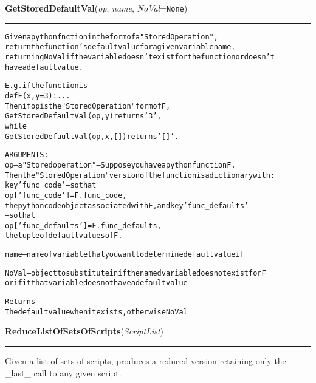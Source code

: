     \vspace{0.5ex}

\hspace{.8\funcindent}\begin{boxedminipage}{\funcwidth}

    \raggedright \textbf{GetStoredDefaultVal}(\textit{op}, \textit{name}, \textit{NoVal}={\tt None})

    \vspace{-1.5ex}

    \rule{\textwidth}{0.5\fboxrule}
\setlength{\parskip}{2ex}
\begin{alltt}

Given a python fnction in the form of a "Stored Operation", 
return the function's default value for a given variable name, 
returning NoVal if the variable doesn't exist for the function or doesn't 
have a default value. 
        
E.g. if the function is 
                def F(x, y=3): ... 
Then if op is the "Stored Operation" form of F, 
        GetStoredDefaultVal(op,y) returns '3' , 
while 
        GetStoredDefaultVal(op,x,[]) returns '[]'.

ARGUMENTS:
op -- a "Stored operation" -- Suppose you have a python function F.  
Then the "Stored Operation" version of the function is a dictionary with:
key 'func\_code' -- so that 
        op['func\_code'] = F.func\_code, 
the python code object associated with F, and key 'func\_defaults'
-- so that 
        op['func\_defaults'] = F.func\_defaults,
the tuple of default values of F.               

name -- name of variable that you want to determine default value if
        
NoVal -- object to substitute in if the named variable does not exist for F 
or if it that variable does not have a default value
        
Returns 
        The default value when it exists, otherwise NoVal
\end{alltt}

\setlength{\parskip}{1ex}
    \end{boxedminipage}

    \label{System:LinkManagement:ReduceListOfSetsOfScripts}

    \vspace{0.5ex}

\hspace{.8\funcindent}\begin{boxedminipage}{\funcwidth}

    \raggedright \textbf{ReduceListOfSetsOfScripts}(\textit{ScriptList})

    \vspace{-1.5ex}

    \rule{\textwidth}{0.5\fboxrule}
\setlength{\parskip}{2ex}
    Given a list of sets of scripts, produces a reduced version retaining 
    only the \_last\_ call to any given script.

\setlength{\parskip}{1ex}
    \end{boxedminipage}

